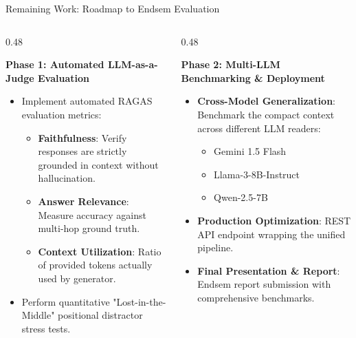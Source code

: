 \documentclass[10pt,aspectratio=169]{beamer}
\begin{document}
\begin{frame}{Remaining Work: Roadmap to Endsem Evaluation}
    \begin{columns}[onlytextwidth,T]
        \begin{column}{0.48\textwidth}
            \begin{block}{\textbf{Phase 1: Automated LLM-as-a-Judge Evaluation}}
                \begin{itemize}
                    \item Implement automated RAGAS evaluation metrics:
                    \begin{itemize}
                        \item \textbf{Faithfulness}: Verify responses are strictly grounded in context without hallucination.
                        \item \textbf{Answer Relevance}: Measure accuracy against multi-hop ground truth.
                        \item \textbf{Context Utilization}: Ratio of provided tokens actually used by generator.
                    \end{itemize}
                    \item Perform quantitative "Lost-in-the-Middle" positional distractor stress tests.
                \end{itemize}
            \end{block}
        \end{column}
        
        \begin{column}{0.48\textwidth}
            \begin{block}{\textbf{Phase 2: Multi-LLM Benchmarking \& Deployment}}
                \begin{itemize}
                    \item \textbf{Cross-Model Generalization}: Benchmark the compact context across different LLM readers:
                    \begin{itemize}
                        \item Gemini 1.5 Flash
                        \item Llama-3-8B-Instruct
                        \item Qwen-2.5-7B
                    \end{itemize}
                    \item \textbf{Production Optimization}: REST API endpoint wrapping the unified pipeline.
                    \item \textbf{Final Presentation \& Report}: Endsem report submission with comprehensive benchmarks.
                \end{itemize}
            \end{block}
        \end{column}
    \end{columns}
\end{frame}
\end{document}
